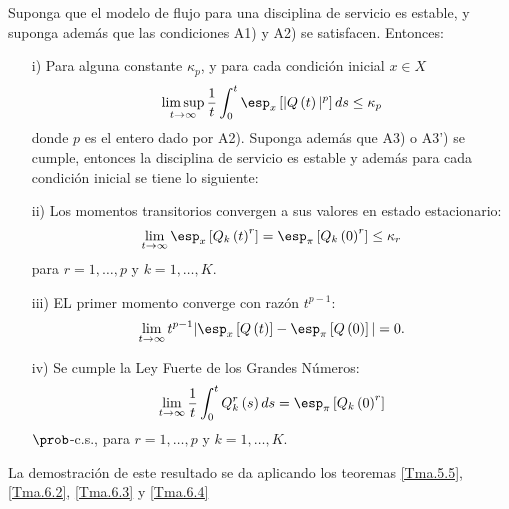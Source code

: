 \begin{Teo}\label{Tma.4.1}
Suponga que el modelo de flujo para una disciplina de servicio es
estable, y suponga adem\'as que las condiciones A1) y A2) se
satisfacen. Entonces:
\begin{itemize}
\item[i)] Para alguna constante $\kappa_{p}$, y para cada
condici\'on inicial $x\in X$
\begin{equation}
\limsup_{t\rightarrow\infty}\frac{1}{t}\int_{0}^{t}\esp_{x}\left[|Q\left(t\right)|^{p}\right]ds\leq\kappa_{p}
\end{equation}
donde $p$ es el entero dado por A2). Suponga adem\'as que A3) o A3')
se cumple, entonces la disciplina de servicio es estable y adem\'as
para cada condici\'on inicial se tiene lo siguiente: \item[ii)] Los
momentos transitorios convergen a sus valores en estado
estacionario:
\begin{equation}
\lim_{t\rightarrow\infty}\esp_{x}\left[Q_{k}\left(t\right)^{r}\right]=\esp_{\pi}\left[Q_{k}\left(0\right)^{r}\right]\leq\kappa_{r}
\end{equation}
para $r=1,\ldots,p$ y $k=1,\ldots,K$. \item[iii)] EL primer
momento converge con raz\'on $t^{p-1}$:
\begin{equation}
\lim_{t\rightarrow\infty}t^{p-1}|\esp_{x}\left[Q\left(t\right)\right]-\esp_{\pi}\left[Q\left(0\right)\right]|=0.
\end{equation}
\item[iv)] Se cumple la Ley Fuerte de los Grandes N\'umeros:
\begin{equation}
\lim_{t\rightarrow\infty}\frac{1}{t}\int_{0}^{t}Q_{k}^{r}\left(s\right)ds=\esp_{\pi}\left[Q_{k}\left(0\right)^{r}\right]
\end{equation}
$\prob$-c.s., para $r=1,\ldots,p$ y $k=1,\ldots,K$.
\end{itemize}
\end{Teo}
\begin{Dem}
La demostraci\'on de este resultado se da aplicando los teoremas
\ref{Tma.5.5}, \ref{Tma.6.2}, \ref{Tma.6.3} y \ref{Tma.6.4}
\end{Dem}


